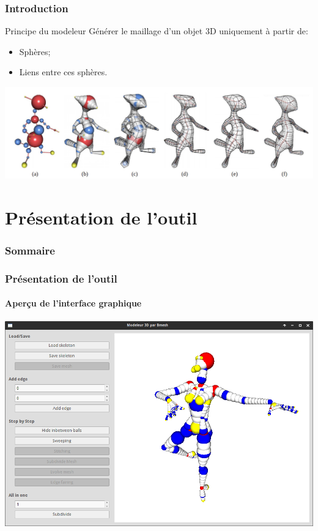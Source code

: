 \documentclass[9pt]{beamer}
\begin{document}
\begin{frame}
	\frametitle{Introduction}
	\begin{block}{Principe du modeleur}
		Générer le maillage d'un objet 3D uniquement à partir de:
		\begin{itemize}
			\item Sphères;
			\item Liens entre ces sphères.
		\end{itemize}
	\end{block}
	
	\begin{center}
		\includegraphics[scale=0.2]{images/bmesh.jpg}
	\end{center}
\end{frame}


\section{Présentation de l'outil}

\begin{frame}
	\frametitle{Sommaire}
	\tableofcontents[currentsection]
\end{frame}

\begin{frame}
	\frametitle{Présentation de l'outil}
	\framesubtitle{Aperçu de l'interface graphique}
	\begin{center}
		\includegraphics[scale=0.27]{images/screenshot.png}
	\end{center}
\end{frame}
\end{document}

